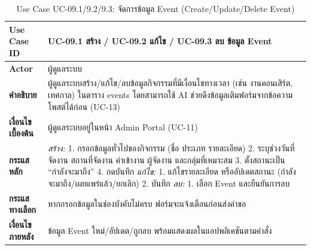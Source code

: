 \begin{table}[H]
\centering
\caption{Use Case UC-09.1/9.2/9.3: จัดการข้อมูล Event (Create/Update/Delete Event)}
\label{tab:uc09x}
\begin{tabular}{|p{3.2cm}|p{10cm}|}
\hline
\textbf{Use Case ID} & UC-09.1 สร้าง / UC-09.2 แก้ไข / UC-09.3 ลบ ข้อมูล Event \\ \hline
\textbf{Actor} & ผู้ดูแลระบบ \\ \hline
\textbf{คำอธิบาย} & ผู้ดูแลระบบสร้าง/แก้ไข/ลบข้อมูลกิจกรรมที่มีเงื่อนไขทางเวลา (เช่น งานคอนเสิร์ต, เทศกาล) ในตาราง events โดยสามารถใช้ AI ช่วยดึงข้อมูลเติมฟอร์มจากข้อความโพสต์ได้ก่อน (UC-13) \\ \hline
\textbf{เงื่อนไขเบื้องต้น} & ผู้ดูแลระบบอยู่ในหน้า Admin Portal (UC-11) \\ \hline
\textbf{กระแสหลัก} & \textit{สร้าง:} 1. กรอกข้อมูลทั่วไปของกิจกรรม (ชื่อ ประเภท รายละเอียด) 2. ระบุช่วงวันที่จัดงาน สถานที่จัดงาน ค่าเข้างาน ผู้จัดงาน และกลุ่มที่เหมาะสม 3. ตั้งสถานะเป็น ``กำลังจะมาถึง'' 4. กดบันทึก \newline \textit{แก้ไข:} 1. แก้ไขรายละเอียด หรืออัปเดตสถานะ (กำลังจะมาถึง/เผยแพร่แล้ว/ยกเลิก) 2. บันทึก \newline \textit{ลบ:} 1. เลือก Event และยืนยันการลบ \\ \hline
\textbf{กระแสทางเลือก} & หากกรอกข้อมูลในช่องบังคับไม่ครบ ฟอร์มจะแจ้งเตือนก่อนส่งคำขอ \\ \hline
\textbf{เงื่อนไขภายหลัง} & ข้อมูล Event ใหม่/อัปเดต/ถูกลบ พร้อมแสดงผลในแอปพลิเคชันตามคำสั่ง \\
\hline
\end{tabular}
\end{table}

